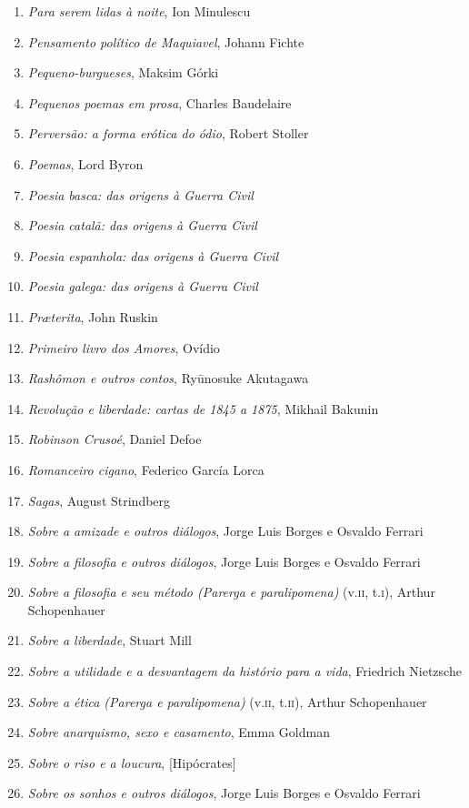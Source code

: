 \begin{enumerate}
\item \textit{Para serem lidas à noite}, Ion Minulescu
\item \textit{Pensamento político de Maquiavel}, Johann Fichte
\item \textit{Pequeno-burgueses}, Maksim Górki
\item \textit{Pequenos poemas em prosa}, Charles Baudelaire
\item \textit{Perversão: a forma erótica do ódio}, Robert Stoller
\item \textit{Poemas}, Lord Byron
\item \textit{Poesia basca: das origens à Guerra Civil} 
\item \textit{Poesia catalã: das origens à Guerra Civil} 
\item \textit{Poesia espanhola: das origens à Guerra Civil} 
\item \textit{Poesia galega: das origens à Guerra Civil} 
\item \textit{Pr\ae terita}, John Ruskin
\item \textit{Primeiro livro dos Amores}, Ovídio
\item \textit{Rashômon e outros contos}, Ryūnosuke Akutagawa
\item \textit{Revolução e liberdade: cartas de 1845 a 1875}, Mikhail Bakunin
\item \textit{Robinson Crusoé}, Daniel Defoe
\item \textit{Romanceiro cigano}, Federico García Lorca
\item \textit{Sagas}, August Strindberg
\item \textit{Sobre a amizade e outros diálogos}, Jorge Luis Borges e Osvaldo Ferrari
\item \textit{Sobre a filosofia e outros diálogos}, Jorge Luis Borges e Osvaldo Ferrari
\item \textit{Sobre a filosofia e seu método (Parerga e paralipomena)} (v.\textsc{ii}, t.\textsc{i}), Arthur Schopenhauer 
\item \textit{Sobre a liberdade}, Stuart Mill
\item \textit{Sobre a utilidade e a desvantagem da histório para a vida}, Friedrich Nietzsche
\item \textit{Sobre a ética (Parerga e paralipomena)} (v.\textsc{ii}, t.\textsc{ii}), Arthur Schopenhauer 
\item \textit{Sobre anarquismo, sexo e casamento}, Emma Goldman
\item \textit{Sobre o riso e a loucura}, [Hipócrates]
\item \textit{Sobre os sonhos e outros diálogos}, Jorge Luis Borges e Osvaldo Ferrari

\end{enumerate}
